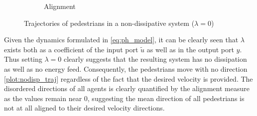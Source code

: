 \begin{itemize}
\begin{figure}[H]
\begin{subfigure}{.49\textwidth}
        \caption{Alignment}
        \label{plot:nodisp_alignment}
    \end{subfigure}
    \caption{Trajectories of pedestrians in a non-dissipative system ($\lambda = 0$)}
    \label{plot:nodisp}
\end{figure}

Given the dynamics formulated in \autoref{eq:ph_model}, it can be clearly seen that $\lambda$ exists both as a coefficient of the input port $\tilde u$ as well as in the output port $y$. Thus setting $\lambda = 0$ clearly suggests that the resulting system has no dissipation as well as no energy feed. Consequently, the pedestrians move with no direction \autoref{plot:nodisp_traj} regardless of the fact that the desired velocity is provided. The disordered directions of all agents is clearly quantified by the alignment measure as the values remain near 0, suggesting the mean direction of all pedestrians is not at all aligned to their desired velocity directions.


\end{itemize}
